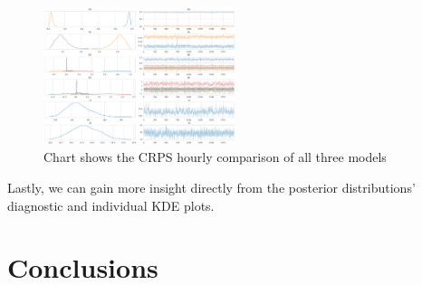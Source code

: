 \documentclass[11pt, letterpaper, journal]{IEEEtran}
\begin{document}
\begin{figure}[h]
\centering
\includegraphics[width=0.5\textwidth]{5.b.png}
\caption{Chart shows the CRPS hourly comparison of all three models}
\label{fig:CRPS_comp}
\end{figure}

Lastly, we can gain more insight directly from the posterior distributions' diagnostic and individual KDE plots.

\section{Conclusions}


\printbibliography[heading=bibintoc, title={References}]
\end{document}

